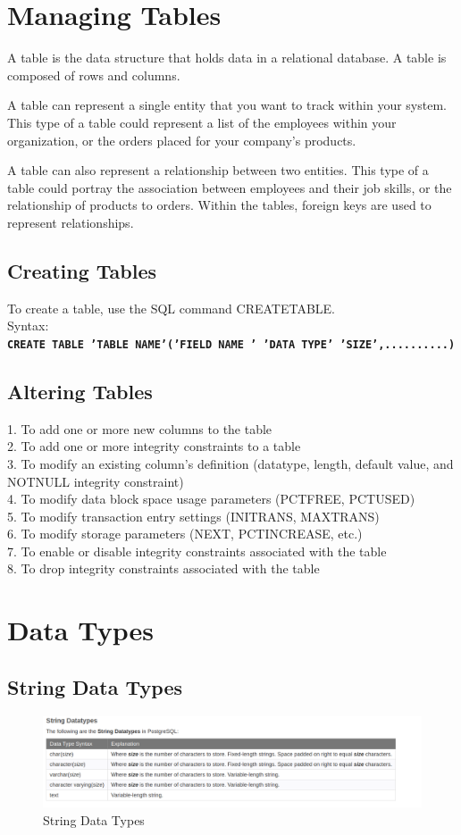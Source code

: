 \documentclass{article}
\begin{document}
\section{Managing Tables}
A table is the data structure that holds data in a relational database. A table is composed of rows and
columns.
\par A table can represent a single entity that you want to track within your system. This type of a table
could represent a list of the employees within your organization, or the orders placed for your
company's products.
\par A table can also represent a relationship between two entities. This type of a table could portray the
association between employees and their job skills, or the relationship of products to orders. Within
the tables, foreign keys are used to represent relationships.
\subsection{Creating Tables}
To create a table, use the SQL command CREATETABLE. \\
Syntax:\\
\texttt {\bf CREATE TABLE 'TABLE NAME'('FIELD NAME ' 'DATA TYPE' 'SIZE',..........) }
\subsection{Altering Tables}
1. To add one or more new columns to the table\\
2. To add one or more integrity constraints to a table\\
3. To modify an existing column's definition (datatype, length, default value, and NOTNULL
integrity constraint)\\
4. To modify data block space usage parameters (PCTFREE, PCTUSED)\\
5. To modify transaction entry settings (INITRANS, MAXTRANS)\\
6. To modify storage parameters (NEXT, PCTINCREASE, etc.)\\
7. To enable or disable integrity constraints associated with the table\\
8. To drop integrity constraints associated with the table\\

\section{Data Types}
\subsection{String Data Types}
\begin{figure}[H]
\centering
\includegraphics[width=15cm]{1.png}
\caption{String Data Types}\label{delete}
\end{figure}
\end{document}

